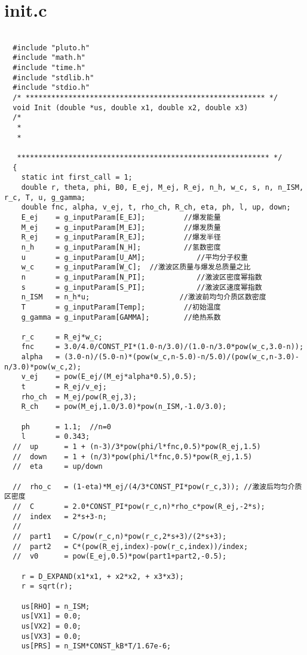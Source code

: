 \section{init.c}
\label{init}
\begin{lstlisting}

  #include "pluto.h"
  #include "math.h"
  #include "time.h"
  #include "stdlib.h"
  #include "stdio.h"
  /* ******************************************************** */
  void Init (double *us, double x1, double x2, double x3)
  /*
   *
   *

   *********************************************************** */
  {
    static int first_call = 1;
    double r, theta, phi, B0, E_ej, M_ej, R_ej, n_h, w_c, s, n, n_ISM, r_c, T, u, g_gamma;
    double fnc, alpha, v_ej, t, rho_ch, R_ch, eta, ph, l, up, down;
    E_ej    = g_inputParam[E_EJ];         //爆发能量
    M_ej    = g_inputParam[M_EJ];         //爆发质量
    R_ej    = g_inputParam[R_EJ];         //爆发半径
    n_h     = g_inputParam[N_H];          //氢数密度
    u       = g_inputParam[U_AM];            //平均分子权重
    w_c     = g_inputParam[W_C];  //激波区质量与爆发总质量之比
    n       = g_inputParam[N_PI];            //激波区密度幂指数
    s       = g_inputParam[S_PI];            //激波区速度幂指数
    n_ISM   = n_h*u;                     //激波前均匀介质区数密度
    T       = g_inputParam[Temp];         //初始温度
    g_gamma = g_inputParam[GAMMA];        //绝热系数

    r_c     = R_ej*w_c;
    fnc     = 3.0/4.0/CONST_PI*(1.0-n/3.0)/(1.0-n/3.0*pow(w_c,3.0-n));
    alpha   = (3.0-n)/(5.0-n)*(pow(w_c,n-5.0)-n/5.0)/(pow(w_c,n-3.0)-n/3.0)*pow(w_c,2);
    v_ej    = pow(E_ej/(M_ej*alpha*0.5),0.5);
    t       = R_ej/v_ej;
    rho_ch  = M_ej/pow(R_ej,3);
    R_ch    = pow(M_ej,1.0/3.0)*pow(n_ISM,-1.0/3.0);

    ph      = 1.1;  //n=0
    l       = 0.343;
  //  up      = 1 + (n-3)/3*pow(phi/l*fnc,0.5)*pow(R_ej,1.5)
  //  down    = 1 + (n/3)*pow(phi/l*fnc,0.5)*pow(R_ej,1.5)
  //  eta     = up/down

  //  rho_c   = (1-eta)*M_ej/(4/3*CONST_PI*pow(r_c,3)); //激波后均匀介质区密度
  //  C       = 2.0*CONST_PI*pow(r_c,n)*rho_c*pow(R_ej,-2*s);
  //  index   = 2*s+3-n;
  //
  //  part1   = C/pow(r_c,n)*pow(r_c,2*s+3)/(2*s+3);
  //  part2   = C*(pow(R_ej,index)-pow(r_c,index))/index;
  //  v0      = pow(E_ej,0.5)*pow(part1+part2,-0.5);

    r = D_EXPAND(x1*x1, + x2*x2, + x3*x3);
    r = sqrt(r);

    us[RHO] = n_ISM;
    us[VX1] = 0.0;
    us[VX2] = 0.0;
    us[VX3] = 0.0;
    us[PRS] = n_ISM*CONST_kB*T/1.67e-6;


\end{lstlisting}
